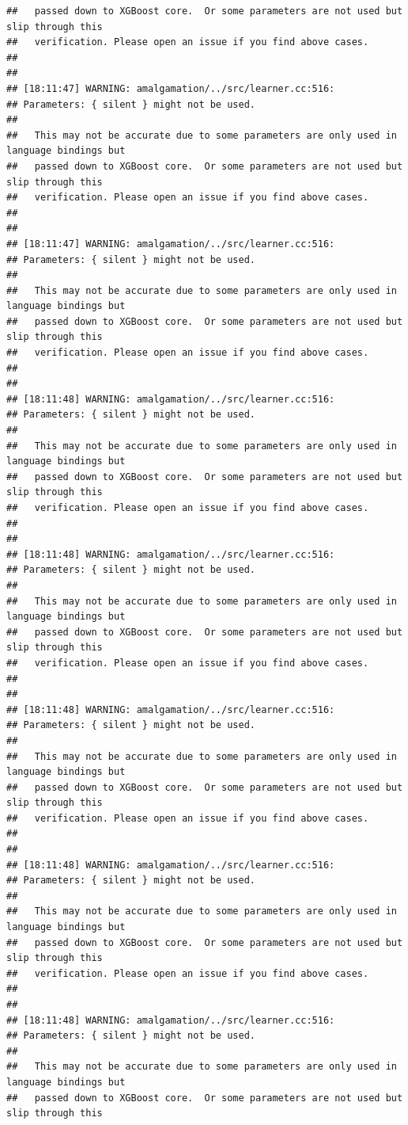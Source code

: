\documentclass[AMS,STIX2COL]{WileyNJD-v2}\usepackage[]{graphicx}\usepackage[]{color}
\makeatletter
\newenvironment{kframe}{%
 \def\at@end@of@kframe{}%
 \ifinner\ifhmode%
  \def\at@end@of@kframe{\end{minipage}}%
  \begin{minipage}{\columnwidth}%
 \fi\fi%
 \def\FrameCommand##1{\hskip\@totalleftmargin \hskip-\fboxsep
 \colorbox{shadecolor}{##1}\hskip-\fboxsep
     \hskip-\linewidth \hskip-\@totalleftmargin \hskip\columnwidth}%
 \MakeFramed {\advance\hsize-\width
   \@totalleftmargin\z@ \linewidth\hsize
   \@setminipage}}%
 {\par\unskip\endMakeFramed%
 \at@end@of@kframe}
\newenvironment{knitrout}{}{} %
\makeatother
\begin{document}
\begin{knitrout}
\begin{kframe}
\begin{verbatim}
##   passed down to XGBoost core.  Or some parameters are not used but slip through this
##   verification. Please open an issue if you find above cases.
## 
## 
## [18:11:47] WARNING: amalgamation/../src/learner.cc:516: 
## Parameters: { silent } might not be used.
## 
##   This may not be accurate due to some parameters are only used in language bindings but
##   passed down to XGBoost core.  Or some parameters are not used but slip through this
##   verification. Please open an issue if you find above cases.
## 
## 
## [18:11:47] WARNING: amalgamation/../src/learner.cc:516: 
## Parameters: { silent } might not be used.
## 
##   This may not be accurate due to some parameters are only used in language bindings but
##   passed down to XGBoost core.  Or some parameters are not used but slip through this
##   verification. Please open an issue if you find above cases.
## 
## 
## [18:11:48] WARNING: amalgamation/../src/learner.cc:516: 
## Parameters: { silent } might not be used.
## 
##   This may not be accurate due to some parameters are only used in language bindings but
##   passed down to XGBoost core.  Or some parameters are not used but slip through this
##   verification. Please open an issue if you find above cases.
## 
## 
## [18:11:48] WARNING: amalgamation/../src/learner.cc:516: 
## Parameters: { silent } might not be used.
## 
##   This may not be accurate due to some parameters are only used in language bindings but
##   passed down to XGBoost core.  Or some parameters are not used but slip through this
##   verification. Please open an issue if you find above cases.
## 
## 
## [18:11:48] WARNING: amalgamation/../src/learner.cc:516: 
## Parameters: { silent } might not be used.
## 
##   This may not be accurate due to some parameters are only used in language bindings but
##   passed down to XGBoost core.  Or some parameters are not used but slip through this
##   verification. Please open an issue if you find above cases.
## 
## 
## [18:11:48] WARNING: amalgamation/../src/learner.cc:516: 
## Parameters: { silent } might not be used.
## 
##   This may not be accurate due to some parameters are only used in language bindings but
##   passed down to XGBoost core.  Or some parameters are not used but slip through this
##   verification. Please open an issue if you find above cases.
## 
## 
## [18:11:48] WARNING: amalgamation/../src/learner.cc:516: 
## Parameters: { silent } might not be used.
## 
##   This may not be accurate due to some parameters are only used in language bindings but
##   passed down to XGBoost core.  Or some parameters are not used but slip through this

\end{verbatim}
\end{kframe}
\end{knitrout}
\end{document}
